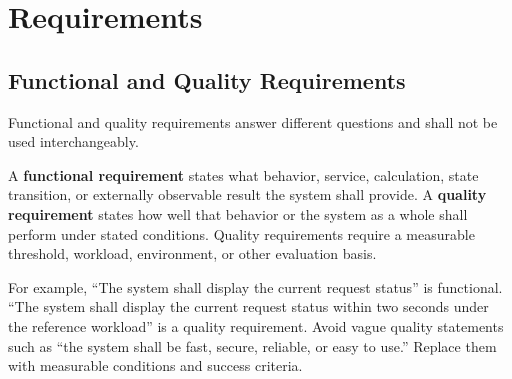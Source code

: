 \chapter{Requirements}



\section{Functional and Quality Requirements}
Functional and quality requirements answer different questions and shall not be
used interchangeably.

\begin{dsnNote}
A \textbf{functional requirement} states what behavior, service, calculation,
state transition, or externally observable result the system shall provide. A
\textbf{quality requirement} states how well that behavior or the system as a
whole shall perform under stated conditions. Quality requirements require a
measurable threshold, workload, environment, or other evaluation basis.
\end{dsnNote}

For example, ``The system shall display the current request status'' is
functional. ``The system shall display the current request status within two
seconds under the reference workload'' is a quality requirement. Avoid vague
quality statements such as ``the system shall be fast, secure, reliable, or
easy to use.'' Replace them with measurable conditions and success criteria.

